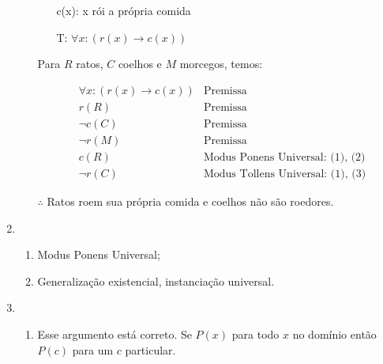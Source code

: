 \documentclass[leqno]{article} %
\begin{document}
\begin{enumerate}
\begin{enumerate}
\begin{itemize}
                    \item[c(x):] x rói a própria comida

                    \item[T:] \( \forall x: (r(x) \to c(x)) \)

                \end{itemize}

                Para \( R \) ratos, \( C \) coelhos e \( M \) morcegos, temos:

                \setcounter{equation}{0}%
                \begin{align}
                     &\forall x: (r(x) \to c(x)) &\textrm{Premissa} \\
                     &r(R) &\textrm{Premissa} \\
                     &\neg c(C)&\textrm{Premissa} \\
                     &\neg r(M)&\textrm{Premissa} \\
                     &c(R) &\textrm{Modus Ponens Universal: (1), (2)} \\
                     &\neg r(C) &\textrm{Modus Tollens Universal: (1), (3)}
                \end{align}

                \( \therefore \) Ratos roem sua própria comida e coelhos não são roedores.
        \end{enumerate}

    \item 

        \begin{enumerate}

            \item Modus Ponens Universal;

            \item Generalização existencial, instanciação universal.

        \end{enumerate}

    \item 

        \begin{enumerate}

            \item Esse argumento está correto. Se \( P(x) \) para todo \( x \) no domínio então \( P(c) \) para um \( c \) particular.


\end{enumerate}
\end{enumerate}
\end{document}
